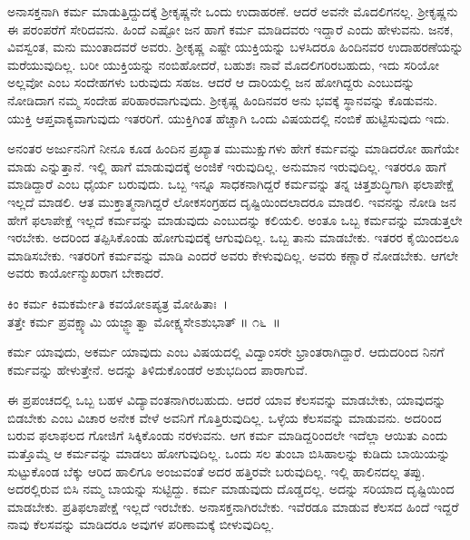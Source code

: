 ಅನಾಸಕ್ತನಾಗಿ ಕರ್ಮ ಮಾಡುತ್ತಿದ್ದುದಕ್ಕೆ ಶ‍್ರೀಕೃಷ್ಣನೇ ಒಂದು ಉದಾಹರಣೆ. ಆದರೆ ಅವನೇ ಮೊದಲಿಗನಲ್ಲ. ಶ‍್ರೀಕೃಷ್ಣನು ಈ ಪರಂಪರೆಗೆ ಸೇರಿದವನು. ಹಿಂದೆ ಎಷ್ಟೋ ಜನ ಹಾಗೆ ಕರ್ಮ ಮಾಡಿದವರು ಇದ್ದಾರೆ ಎಂದು ಹೇಳುವನು. ಜನಕ, ವಿವಸ್ವಂತ, ಮನು ಮುಂತಾದವರೆ ಅವರು. ಶ‍್ರೀಕೃಷ್ಣ ಎಷ್ಟೇ ಯುಕ್ತಿಯನ್ನು ಬಳಸಿದರೂ ಹಿಂದಿನವರ ಉದಾಹರಣೆಯನ್ನು ಮರೆಯುವುದಿಲ್ಲ. ಬರೀ ಯುಕ್ತಿಯನ್ನು ನಂಬಿಹೋದರೆ, ಬಹುಶಃ ನಾವೆ ಮೊದಲಿಗರಿರಬಹುದು, ಇದು ಸರಿಯೋ ಅಲ್ಲವೋ ಎಂಬ ಸಂದೇಹಗಳು ಬರುವುದು ಸಹಜ. ಆದರೆ ಆ ದಾರಿಯಲ್ಲಿ ಜನ ಹೋಗಿದ್ದರು ಎಂಬುದನ್ನು ನೋಡಿದಾಗ ನಮ್ಮ ಸಂದೇಹ ಪರಿಹಾರವಾಗುವುದು. ಶ‍್ರೀಕೃಷ್ಣ ಹಿಂದಿನವರ ಅನು ಭವಕ್ಕೆ ಸ್ಥಾನವನ್ನು ಕೊಡುವನು. ಯುಕ್ತಿ ಆಪ್ತವಾಕ್ಯವಾಗುವುದು ಇತರರಿಗೆ. ಯುಕ್ತಿಗಿಂತ ಹೆಚ್ಚಾಗಿ ಒಂದು ವಿಷಯದಲ್ಲಿ ನಂಬಿಕೆ ಹುಟ್ಟಿಸುವುದು ಇದು.

ಅನಂತರ ಅರ್ಜುನನಿಗೆ ನೀನೂ ಕೂಡ ಹಿಂದಿನ ಪ್ರಖ್ಯಾತ ಮುಮುಕ್ಷುಗಳು ಹೇಗೆ ಕರ್ಮವನ್ನು ಮಾಡಿದರೋ ಹಾಗೆಯೇ ಮಾಡು ಎನ್ನುತ್ತಾನೆ. ಇಲ್ಲಿ ಹಾಗೆ ಮಾಡುವುದಕ್ಕೆ ಅಂಜಿಕೆ ಇರುವುದಿಲ್ಲ. ಅನುಮಾನ ಇರುವುದಿಲ್ಲ. ಇತರರೂ ಹಾಗೆ ಮಾಡಿದ್ದಾರೆ ಎಂಬ ಧೈರ್ಯ ಬರುವುದು. ಒಬ್ಬ ಇನ್ನೂ ಸಾಧಕನಾಗಿದ್ದರೆ ಕರ್ಮವನ್ನು ತನ್ನ ಚಿತ್ತಶುದ್ಧಿಗಾಗಿ ಫಲಾಪೇಕ್ಷೆ ಇಲ್ಲದೆ ಮಾಡಲಿ. ಆತ ಮುಕ್ತಾತ್ಮನಾಗಿದ್ದರೆ ಲೋಕಸಂಗ್ರಹದ ದೃಷ್ಟಿಯಿಂದಲಾದರೂ ಮಾಡಲಿ. ಇವನನ್ನು ನೋಡಿ ಜನ ಹೇಗೆ ಫಲಾಪೇಕ್ಷೆ ಇಲ್ಲದೆ ಕರ್ಮವನ್ನು ಮಾಡುವುದು ಎಂಬುದನ್ನು ಕಲಿಯಲಿ. ಅಂತೂ ಒಬ್ಬ ಕರ್ಮವನ್ನು ಮಾಡುತ್ತಲೇ ಇರಬೇಕು. ಅದರಿಂದ ತಪ್ಪಿಸಿಕೊಂಡು ಹೋಗುವುದಕ್ಕೆ ಆಗುವುದಿಲ್ಲ. ಒಬ್ಬ ತಾನು ಮಾಡಬೇಕು. ಇತರರ ಕೈಯಿಂದಲೂ ಮಾಡಿಸಬೇಕು. ಇತರರಿಗೆ ಕರ್ಮವನ್ನು ಮಾಡಿ ಎಂದರೆ ಅವರು ಕೇಳುವುದಿಲ್ಲ. ಅವರು ಕಣ್ಣಾರೆ ನೋಡಬೇಕು. ಆಗಲೇ ಅವರು ಕಾರ್ಯೋನ್ಮುಖರಾಗ ಬೇಕಾದರೆ.

\begin{shloka}
ಕಿಂ ಕರ್ಮ ಕಿಮಕರ್ಮೇತಿ ಕವಯೋಽಪ್ಯತ್ರ ಮೋಹಿತಾಃ~।\\ತತ್ತೇ ಕರ್ಮ ಪ್ರವಕ್ಷ್ಯಾಮಿ ಯಜ್ಜ್ಞಾತ್ವಾ ಮೋಕ್ಷ್ಯಸೇಽಶುಭಾತ್ \hfill॥ ೧೬~॥
\end{shloka}

\begin{artha}
ಕರ್ಮ ಯಾವುದು, ಅಕರ್ಮ ಯಾವುದು ಎಂಬ ವಿಷಯದಲ್ಲಿ ವಿದ್ವಾಂಸರೇ ಭ್ರಾಂತರಾಗಿದ್ದಾರೆ. ಆದುದರಿಂದ ನಿನಗೆ ಕರ್ಮವನ್ನು ಹೇಳುತ್ತೇನೆ. ಅದನ್ನು ತಿಳಿದುಕೊಂಡರೆ ಅಶುಭದಿಂದ ಪಾರಾಗುವೆ.
\end{artha}

ಈ ಪ್ರಪಂಚದಲ್ಲಿ ಒಬ್ಬ ಬಹಳ ವಿದ್ಯಾವಂತನಾಗಿರಬಹುದು. ಆದರೆ ಯಾವ ಕೆಲಸವನ್ನು ಮಾಡಬೇಕು, ಯಾವುದನ್ನು ಬಿಡಬೇಕು ಎಂಬ ವಿಚಾರ ಅನೇಕ ವೇಳೆ ಅವನಿಗೆ ಗೊತ್ತಿರುವುದಿಲ್ಲ. ಒಳ್ಳೆಯ ಕೆಲಸವನ್ನು ಮಾಡುವನು. ಅದರಿಂದ ಬರುವ ಫಲಾಫಲದ ಗೋಜಿಗೆ ಸಿಕ್ಕಿಕೊಂಡು ನರಳುವನು. ಆಗ ಕರ್ಮ ಮಾಡಿದ್ದರಿಂದಲೇ ಇದೆಲ್ಲಾ ಆಯಿತು ಎಂದು ಮತ್ತೊಮ್ಮೆ ಆ ಕರ್ಮವನ್ನು ಮಾಡಲು ಹೋಗುವುದಿಲ್ಲ. ಒಂದು ಸಲ ತುಂಬಾ ಬಿಸಿಹಾಲನ್ನು ಕುಡಿದು ಬಾಯಿಯನ್ನು ಸುಟ್ಟುಕೊಂಡ ಬೆಕ್ಕು ಆರಿದ ಹಾಲಿಗೂ ಅಂಜುವಂತೆ ಅದರ ಹತ್ತಿರವೇ ಬರುವುದಿಲ್ಲ. ಇಲ್ಲಿ ಹಾಲಿನದಲ್ಲ ತಪ್ಪು. ಅದರಲ್ಲಿರುವ ಬಿಸಿ ನಮ್ಮ ಬಾಯನ್ನು ಸುಟ್ಟಿದ್ದು. ಕರ್ಮ ಮಾಡುವುದು ದೊಡ್ಡದಲ್ಲ. ಅದನ್ನು ಸರಿಯಾದ ದೃಷ್ಟಿಯಿಂದ ಮಾಡಬೇಕು. ಪ್ರತಿಫಲಾಪೇಕ್ಷೆ ಇಲ್ಲದೆ ಇರಬೇಕು. ಅನಾಸಕ್ತನಾಗಿರಬೇಕು. ಇವೆರಡೂ ಮಾಡುವ ಕೆಲಸದ ಹಿಂದೆ ಇದ್ದರೆ ನಾವು ಕೆಲಸವನ್ನು ಮಾಡಿದರೂ ಅವುಗಳ ಪರಿಣಾಮಕ್ಕೆ ಬೀಳುವುದಿಲ್ಲ.

